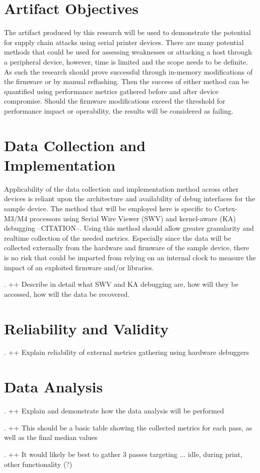 \section{Artifact Objectives} \label{artifactobjectives}

The artifact produced by this research will be used to demonstrate the potential for supply chain attacks using serial printer devices. There are many potential methods that could be used for assessing weaknesses or attacking a host through a peripheral device, however, time is limited and the scope needs to be definite. As such the research should prove successful through in-memory modifications of the firmware or by manual reflashing. Then the success of either method can be quantified using performance metrics gathered before and after device compromise. Should the firmware modifications exceed the threshold for performance impact or operability, the results will be considered as failing.

\section{Data Collection and Implementation} \label{datacollectionimplementation}

Applicability of the data collection and implementation method across other devices is reliant upon the architecture and availability of debug interfaces for the sample device. The method that will be employed here is specific to Cortex-M3/M4 processors using Serial Wire Viewer (SWV) and kernel-aware (KA) debugging --CITATION--. Using this method should allow greater granularity and realtime collection of the needed metrics. Especially since the data will be collected externally from the hardware and firmware of the sample device, there is no risk that could be imparted from relying on an internal clock to measure the impact of an exploited firmware and/or libraries. 

. ++ Describe in detail what SWV and KA debugging are, how will they be accessed, how will the data be recovered.

\section{Reliability and Validity} \label{artifactobjectives}

. ++ Explain reliability of external metrics gathering using hardware debuggers

\section{Data Analysis} \label{dataanalysis}

. ++ Explain and demonstrate how the data analysis will be performed

. ++ This should be a basic table showing the collected metrics for each pass, as well as the final median values

. ++ It would likely be best to gather 3 passes targeting ... idle, during print, other functionality (?) 

